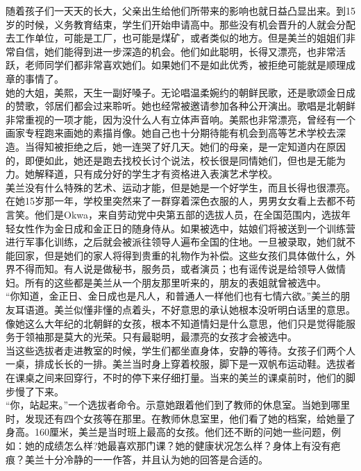 随着孩子们一天天的长大，父亲出生给他们所带来的影响也就日益凸显出来。到15岁的时候，义务教育结束，学生们开始申请高中。那些没有机会晋升的人就会分配去工作单位，可能是工厂，也可能是煤矿，或者类似的地方。但是美兰的姐姐们非常自信，她们能得到进一步深造的机会。他们如此聪明，长得又漂亮，也非常活跃，老师同学们都非常喜欢她们。如果她们不是如此优秀，被拒绝可能就是顺理成章的事情了。\\

她的大姐，美熙，天生一副好嗓子。无论唱温柔婉约的朝鲜民歌，还是歌颂金日成的赞歌，邻居们都会过来聆听。她也经常被邀请参加各种公开演出。歌唱是北朝鲜非常重视的一项才能，因为没什么人有立体声音响。美熙也非常漂亮，曾经有一个画家专程跑来画她的素描肖像。她自己也十分期待能有机会到高等艺术学校去深造。当得知被拒绝之后，她一连哭了好几天。她们的母亲，是一定知道内在原因的，即便如此，她还是跑去找校长讨个说法，校长很是同情她们，但也是无能为力。她解释道，只有成分好的学生才有资格进入表演艺术学校。\\

美兰没有什么特殊的艺术、运动才能，但是她是一个好学生，而且长得也很漂亮。在她15岁那一年，学校里突然来了一群穿着深色衣服的人，男男女女看上去都不苟言笑。他们是Okwa，来自劳动党中央第五部的选拔人员，在全国范围内，选拔年轻女性作为金日成和金正日的随身侍从。如果被选中，姑娘们将被送到一个训练营进行军事化训练，之后就会被派往领导人遍布全国的住地。一旦被录取，她们就不能回家，但是她们的家人将得到贵重的礼物作为补偿。这些女孩们具体做什么，外界不得而知。有人说是做秘书，服务员，或者演员；也有谣传说是给领导人做情妇。所有的这些都是美兰从一个朋友那里听来的，朋友的表姐就曾被选中。\\

“你知道，金正日、金日成也是凡人，和普通人一样他们也有七情六欲。”美兰的朋友耳语道。美兰似懂非懂的点着头，不好意思的承认她根本没听明白话里的意思。像她这么大年纪的北朝鲜的女孩，根本不知道情妇是什么意思，他们只是觉得能服务于领袖那是莫大的光荣。只有最聪明，最漂亮的女孩才会被选中。\\

当这些选拔者走进教室的时候，学生们都坐直身体，安静的等待。女孩子们两个人一桌，排成长长的一排。美兰当时身上穿着校服，脚下是一双帆布运动鞋。选拔者在课桌之间来回穿行，不时的停下来仔细打量。当来的美兰的课桌前时，他们的脚步慢了下来。\\

“你，站起来。”一个选拔者命令。示意她跟着他们到了教师的休息室。当她到哪里时，发现还有四个女孩等在那里。在教师休息室里，他们看了她的档案，给她量了身高。160厘米，美兰是当时班上最高的女孩。他们还不断的问她一些问题，例如：她的成绩怎么样?她最喜欢那门课？她的健康状况怎么样？身体上有没有疤痕？美兰十分冷静的一一作答，并且认为她的回答是合适的。\\

